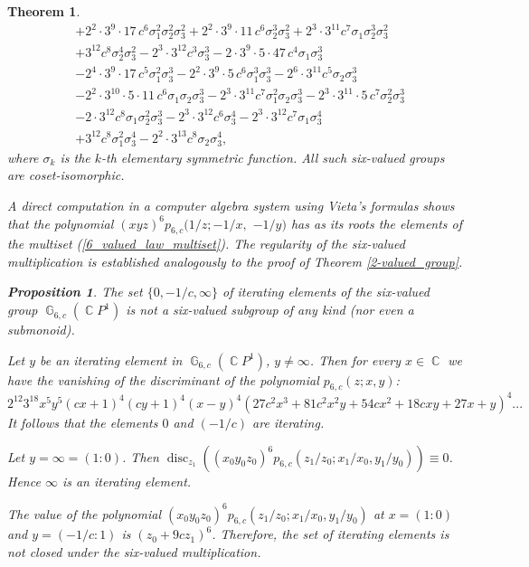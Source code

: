\documentclass[14pt, dvipsnames]{extarticle}
\makeatletter
\theoremstyle{plain}
\newtheorem{theorem}{Theorem}
\newtheorem{prop}{Proposition}
\theoremstyle{definition}
\theoremstyle{remark}
\renewenvironment{proof}[1][\proofname]{
  \par\pushQED{\qed}\normalfont
  \topsep6\p@\@plus6\p@\relax
  \trivlist\item[\hskip\labelsep\bfseries\itshape #1\@addpunct{.}]
}{\popQED\endtrivlist\@endpefalse}
\DeclareMathOperator{\disc}{\mathrm{disc}}
\DeclareMathOperator{\G}{\mathbb{G}}
\DeclareMathOperator{\Cc}{\mathbb{C}}
\makeatother
\begin{document}
\begin{theorem}
\begin{align*}
& + 2^{2}\cdot 3^{9}\cdot 17\, c^{6} \sigma_{1}^{2} \sigma_{2}^{2} \sigma_{3}^{2} 
+ 2^{2}\cdot 3^{9}\cdot 11\, c^{6} \sigma_{2}^{3} \sigma_{3}^{2}
+ 2^{3}\cdot 3^{11} c^{7} \sigma_{1} \sigma_{2}^{3} \sigma_{3}^{2}\\
& + 3^{12} c^{8} \sigma_{2}^{4} \sigma_{3}^{2}
- 2^{3}\cdot 3^{12} c^{3} \sigma_{3}^{3}
- 2\cdot 3^{9}\cdot 5\cdot 47\, c^{4} \sigma_{1} \sigma_{3}^{3}\\
& - 2^{4}\cdot 3^{9}\cdot 17\, c^{5} \sigma_{1}^{2} \sigma_{3}^{3}
- 2^{2}\cdot 3^{9}\cdot 5\, c^{6} \sigma_{1}^{3} \sigma_{3}^{3}
- 2^{6}\cdot 3^{11} c^{5} \sigma_{2} \sigma_{3}^{3}\\
& - 2^{2}\cdot 3^{10}\cdot 5\cdot 11\, c^{6} \sigma_{1} \sigma_{2} \sigma_{3}^{3}
- 2^{3}\cdot 3^{11} c^{7} \sigma_{1}^{2} \sigma_{2} \sigma_{3}^{3}
- 2^{3}\cdot 3^{11}\cdot 5\, c^{7} \sigma_{2}^{2} \sigma_{3}^{3}\\
& - 2\cdot 3^{12} c^{8} \sigma_{1} \sigma_{2}^{2} \sigma_{3}^{3}
- 2^{3}\cdot 3^{12} c^{6} \sigma_{3}^{4}
- 2^{3}\cdot 3^{12} c^{7} \sigma_{1} \sigma_{3}^{4}\\
& + 3^{12} c^{8} \sigma_{1}^{2} \sigma_{3}^{4}
- 2^{2}\cdot 3^{13} c^{8} \sigma_{2} \sigma_{3}^{4},
\end{align*}
where $\sigma_k$ is the $k$-th elementary symmetric function. All such six-valued groups are {coset-isomorphic.}

\begin{proof}
{A direct computation in a computer algebra system using Vieta's formulas shows that the polynomial $(xyz)^6p_{6, c}(1/z; -1/x,$ $ -1/y)$ has as its roots the elements of the multiset (\ref{6_valued_law_multiset}). The regularity of the six-valued multiplication is established analogously to the proof of Theorem \ref{2-valued_group}.}  
\end{proof}


\begin{prop}\label{iterating_6-val}
{The set $\{0, -1/c, \infty\}$ of iterating elements of the six-valued group $\G_{6, c}(\Cc\!P^1)$ is not a six-valued subgroup of any kind {\normalfont(}nor even a submonoid{\normalfont)}.} 
\end{prop}

\begin{proof}
Let $y$ be an iterating element in $\G_{6, c}(\Cc\!P^1)$, {$y\neq \infty$}. Then for every $x\in\Cc$ we have the vanishing of the discriminant of the polynomial $p_{6, c}(z; x, y)$:
$$2^{12}3^{18}x^5 y^5 (c x+1)^4 (c y+1)^4 (x-y)^4 \left(27 c^2 x^3+81 c^2 x^2 y+54 c x^2+18 c x y+27 x+y\right)^4...$$
It follows that the elements $0$ and $(-1/c)$ are iterating.

{Let $y = \infty = (1:0)$. Then
$\disc_{z_1}((x_0y_0z_0)^6p_{6,c}(z_1/z_0; x_1/x_0, y_1/y_0)) \equiv 0$.
Hence $\infty$ is an iterating element.} 

{The value of the polynomial $(x_0y_0z_0)^6p_{6,c}(z_1/z_0; x_1/x_0, y_1/y_0)$ at $x = (1:0)$ and $y = (-1/c:1)$ is $(z_0 + 9 c z_1)^6$. Therefore, the set of iterating elements is not closed under the six-valued multiplication.}
\end{proof}
\end{theorem} 
\end{document}
